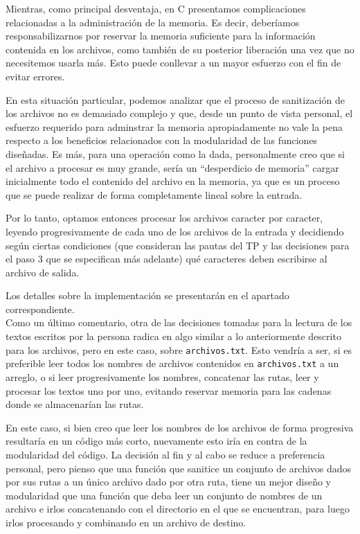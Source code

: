 \documentclass[a4paper]{article}
\begin{document}
Mientras, como principal desventaja, en C presentamos complicaciones relacionadas a la administración de la memoria. Es decir, deberíamos responsabilizarnos por reservar la memoria suficiente para la información contenida en los archivos, como también de su posterior liberación una vez que no necesitemos usarla más. Esto puede conllevar a un mayor esfuerzo con el fin de evitar errores.

En esta situación particular, podemos analizar que el proceso de sanitización de los archivos no es demasiado complejo y que, desde un punto de vista personal, el esfuerzo requerido para adminstrar la memoria apropiadamente no vale la pena respecto a los beneficios relacionados con la modularidad de las funciones diseñadas. Es más, para una operación como la dada, personalmente creo que si el archivo a procesar es muy grande, sería un  ``desperdicio de memoria'' cargar inicialmente todo el contenido del archivo en la memoria, ya que es un proceso que se puede realizar de forma completamente lineal sobre la entrada.

Por lo tanto, optamos entonces procesar los archivos caracter por caracter, leyendo progresivamente de cada uno de los archivos de la entrada y decidiendo según ciertas condiciones (que consideran las pautas del TP y las decisiones para el paso 3 que se especifican más adelante) qué caracteres deben escribirse al archivo de salida.

Los detalles sobre la implementación se presentarán en el apartado correspondiente. \\

Como un último comentario, otra de las decisiones tomadas para la lectura de los textos escritos por la persona radica en algo similar a lo anteriormente descrito para los archivos, pero en este caso, sobre \texttt{archivos.txt}. Esto vendría a ser, si es preferible leer todos los nombres de archivos contenidos en \texttt{archivos.txt} a un arreglo, o si leer progresivamente los nombres, concatenar las rutas, leer y procesar los textos uno por uno, evitando reservar memoria para las cadenas donde se almacenarían las rutas.

En este caso, si bien creo que leer los nombres de los archivos de forma progresiva resultaría en un código más corto, nuevamente esto iría en contra de la modularidad del código. La decisión al fin y al cabo se reduce a preferencia personal, pero pienso que una función que sanitice un conjunto de archivos dados por sus rutas a un único archivo dado por otra ruta, tiene un mejor diseño y modularidad que una función que deba leer un conjunto de nombres de un archivo e irlos concatenando con el directorio en el que se encuentran, para luego irlos procesando y combinando en un archivo de destino.
\end{document}
